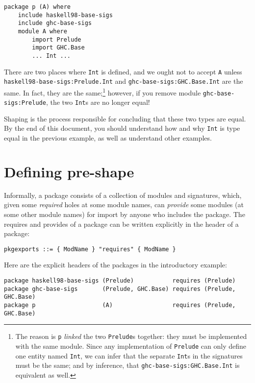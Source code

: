 \documentclass{article}
\begin{document}
\begin{verbatim}
package p (A) where
    include haskell98-base-sigs
    include ghc-base-sigs
    module A where
        import Prelude
        import GHC.Base
        ... Int ...
\end{verbatim}

There are two places where \verb|Int| is defined, and we ought not to
accept \verb|A| unless \verb|haskell98-base-sigs:Prelude.Int| and
\verb|ghc-base-sigs:GHC.Base.Int| are the same.  In fact, they are the
same;\footnote{The reason is \verb|p| \emph{linked} the two \verb|Prelude|s
together: they must be implemented with the same module.  Since any
implementation of \verb|Prelude| can only define one entity named
\verb|Int|, we can infer that the separate \verb|Int|s in the signatures
must be the same; and by inference, that
\verb|ghc-base-sigs:GHC.Base.Int| is equivalent as well.} however, if you
remove module \verb|ghc-base-sigs:Prelude|, the two \verb|Int|s are no longer
equal!

Shaping is the process responsible for concluding that these two types are
equal.  By the end of this document, you should understand how and why \verb|Int|
is type equal in the previous example, as well as understand other examples.

\section{Defining pre-shape}

Informally, a package consists of a collection of modules and
signatures, which, given some \emph{required} holes at some module
names, can \emph{provide} some modules (at some other module names) for
import by anyone who includes the package.  The requires and provides
of a package can be written explicitly in the header of a package:

\begin{verbatim}
pkgexports ::= { ModName } "requires" { ModName }
\end{verbatim}

Here are the explicit headers of the packages in the introductory example:

\begin{verbatim}
package haskell98-base-sigs (Prelude)           requires (Prelude)
package ghc-base-sigs       (Prelude, GHC.Base) requires (Prelude, GHC.Base)
package p                   (A)                 requires (Prelude, GHC.Base)
\end{verbatim}
\end{document}
